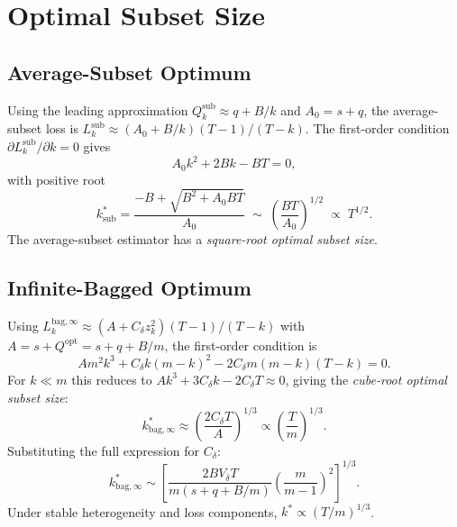 \documentclass[12pt,a4paper]{article}
\theoremstyle{definition}
\begin{document}
\section{Optimal Subset Size}
\label{sec:kstar}

\subsection{Average-Subset Optimum}

Using the leading approximation $Q_k^{\mathrm{sub}}\approx q+B/k$ and
$A_0=s+q$, the average-subset loss is
$L_k^{\mathrm{sub}}\approx(A_0+B/k)(T-1)/(T-k)$.
The first-order condition $\partial L_k^{\mathrm{sub}}/\partial k=0$ gives
\begin{equation}
A_0k^2 + 2Bk - BT = 0,
\end{equation}
with positive root
\begin{equation}\label{eq:kstar_sub}
k^*_{\mathrm{sub}} = \frac{-B+\sqrt{B^2+A_0BT}}{A_0}
\;\sim\; \left(\frac{BT}{A_0}\right)^{1/2}
\;\propto\; T^{1/2}.
\end{equation}
The average-subset estimator has a \emph{square-root optimal subset size}.

\subsection{Infinite-Bagged Optimum}

Using $L_k^{\mathrm{bag},\infty}\approx(A+C_\delta z_k^2)(T-1)/(T-k)$
with $A=s+Q^{\mathrm{opt}}=s+q+B/m$, the first-order condition is
\begin{equation}\label{eq:foc_bag}
Am^2k^3 + C_\delta k(m-k)^2 - 2C_\delta m(m-k)(T-k) = 0.
\end{equation}
For $k\ll m$ this reduces to $Ak^3+3C_\delta k-2C_\delta T\approx 0$,
giving the \emph{cube-root optimal subset size}:
\begin{equation}\label{eq:kstar_bag}
k^*_{\mathrm{bag},\infty} \approx \left(\frac{2C_\delta T}{A}\right)^{1/3}
\propto \left(\frac{T}{m}\right)^{1/3}.
\end{equation}
Substituting the full expression for $C_\delta$:
\begin{equation}
k^*_{\mathrm{bag},\infty} \sim \left[\frac{2BV_\delta T}{m(s+q+B/m)}\!\left(\frac{m}{m-1}\right)^{\!2}\right]^{1/3}.
\end{equation}
Under stable heterogeneity and loss components, $k^*\propto(T/m)^{1/3}$.
\end{document}
